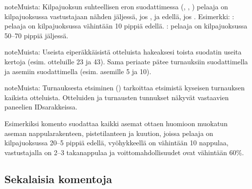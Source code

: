 \documentclass[letterpaper,10pt,finnish]{sphinxmanual}
\begin{document}
\begin{sphinxadmonition}{note}{Muista:}
\sphinxAtStartPar
Kilpajuoksun suhteellisen eron suodattimessa (, , ) pelaaja on kilpajuoksussa vastustajaan nähden jäljessä, jos , ja edellä, jos . Esimerkki:  : pelaaja on kilpajuoksussa vähintään 10 pippiä edellä.  : pelaaja on kilpajuoksussa 50–70 pippiä jäljessä.
\end{sphinxadmonition}

\begin{sphinxadmonition}{note}{Muista:}
\sphinxAtStartPar
Useista ei\sphinxhyphen{}peräkkäisistä otteluista hakeaksesi toista suodatin  useita kertoja (esim.  otteluille 23 ja 43). Sama periaate pätee turnauksiin suodattimella  ja asemiin suodattimella  (esim.  asemille 5 ja 10).
\end{sphinxadmonition}

\begin{sphinxadmonition}{note}{Muista:}
\sphinxAtStartPar
Turnauksesta etsiminen () tarkoittaa etsimistä kyseisen turnauksen kaikista otteluista. Otteluiden ja turnausten tunnukset näkyvät vastaavien paneelien ID\sphinxhyphen{}sarakkeissa.
\end{sphinxadmonition}

\sphinxAtStartPar
Esimerkiksi komento  suodattaa kaikki asemat ottaen huomioon muokatun aseman nappularakenteen, pistetilanteen ja kuution, joissa pelaaja on kilpajuoksussa 20–5 pippiä edellä, vyöhykkeellä on vähintään 10 nappulaa, vastustajalla on 2–3 takanappulaa ja voittomahdollisuudet ovat vähintään 60\%.


\subsection{Sekalaisia komentoja}
\label{\detokenize{cmd_mode:commandes-diverses}}\label{\detokenize{cmd_mode:cmd-misc}}
\end{document}
